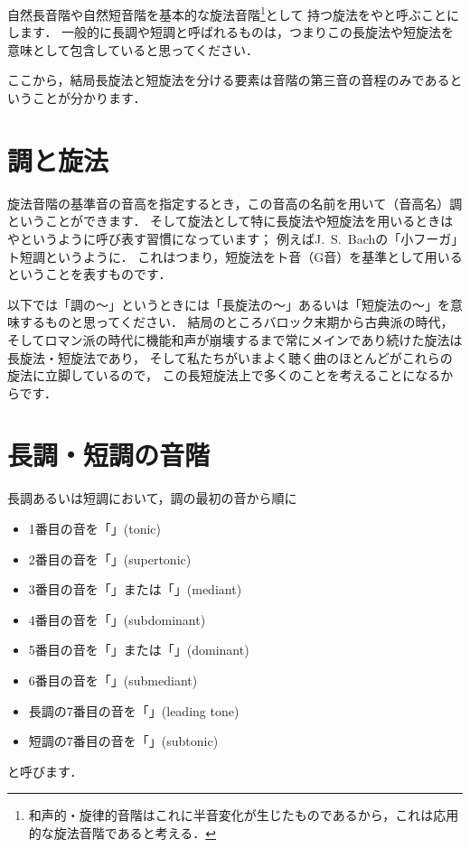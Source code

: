 \documentclass[dvipdfmx,uplatex,b5paper,openany,jbase=12Q,nomag*,textwidth-limit=44%
               ]{gachimuchi}[2020/05/05]
\begin{document}
自然長音階や自然短音階を基本的な旋法音階\footnote{%
  和声的・旋律的音階はこれに半音変化が生じたものであるから，これは応用的な旋法音階であると考える．
}として
持つ旋法をやと呼ぶことにします．
一般的に長調や短調と呼ばれるものは，つまりこの長旋法や短旋法を意味として包含していると思ってください．
\begin{Yodan}
  ここから，結局長旋法と短旋法を分ける要素は音階の第三音の音程のみであるということが分かります．
\end{Yodan}

\section{調と旋法}
旋法音階の基準音の音高を指定するとき，この音高の名前を用いて（音高名）調ということができます．
そして旋法として特に長旋法や短旋法を用いるときはやというように呼び表す習慣になっています；
例えばJ.~S.~Bachの「小フーガ」ト短調というように．
これはつまり，短旋法をト音（G音）を基準として用いるということを表すものです．

以下では「調の～」というときには「長旋法の～」あるいは「短旋法の～」を意味するものと思ってください．
結局のところバロック末期から古典派の時代，
そしてロマン派の時代に機能和声が崩壊するまで常にメインであり続けた旋法は長旋法・短旋法であり，
そして私たちがいまよく聴く曲のほとんどがこれらの旋法に立脚しているので，
この長短旋法上で多くのことを考えることになるからです．


\section{長調・短調の音階}
長調あるいは短調において，調の最初の音から順に
\begin{itemize}
  \item 1番目の音を「」(tonic)
  \item 2番目の音を「」(supertonic)
  \item 3番目の音を「」または「」(mediant)
  \item 4番目の音を「」(subdominant)
  \item 5番目の音を「」または「」(dominant)
  \item 6番目の音を「」(submediant)
  \item 長調の7番目の音を「」(leading tone)
  \item 短調の7番目の音を「」(subtonic)
\end{itemize}
と呼びます．
\end{document}
